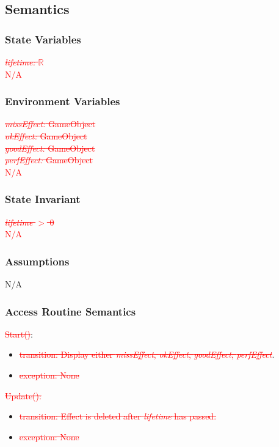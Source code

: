 \documentclass[12pt]{article}
\begin{document}
\subsection{Semantics}
\subsubsection{State Variables}
\textcolor{red}{\sout{\textit{lifetime:} $\mathbb{R}$}}\\
\textcolor{red}{N/A}

\subsubsection{Environment Variables}
\textcolor{red}{\sout{\textit{missEffect:} GameObject}}\\
\textcolor{red}{\sout{\textit{okEffect:} GameObject}}\\
\textcolor{red}{\sout{\textit{goodEffect:} GameObject}}\\
\textcolor{red}{\sout{\textit{perfEffect:} GameObject}}\\
\textcolor{red}{N/A}

\subsubsection{State Invariant}
\textcolor{red}{\sout{\textit{lifetime} $>$ 0}}\\
\textcolor{red}{N/A}

\subsubsection{Assumptions}
N/A

\subsubsection{Access Routine Semantics}
\noindent \textcolor{red}{\sout{Start()}}:
\begin{itemize}
	\item \textcolor{red}{\sout{transition: Display either \textit{missEffect}, \textit{okEffect}, \textit{goodEffect}, \textit{perfEffect}}}.
	\item \textcolor{red}{\sout{exception: None}}
\end{itemize}
\noindent \textcolor{red}{\sout{Update():}}
\begin{itemize}
	\item \textcolor{red}{\sout{transition: Effect is deleted after \textit{lifetime} has passed.}}
	\item \textcolor{red}{\sout{exception: None}}
\end{itemize}
\end{document}
